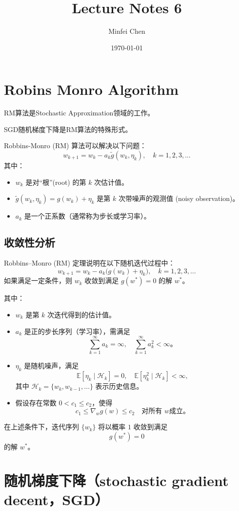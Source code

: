 \documentclass{article}
\begin{document}
\title{Lecture Notes 6}
\author{Minfei Chen}
\date{\today}
\maketitle
\section{Robins Monro Algorithm}
RM算法是Stochastic Approximation领域的工作。

SGD随机梯度下降是RM算法的特殊形式。

Robbins-Monro (RM) 算法可以解决以下问题：
\[
w_{k+1} = w_k - a_k \tilde{g}(w_k, \eta_k), \quad k = 1, 2, 3, \dots
\]
其中：
\begin{itemize}
    \item $w_k$ 是对“根”(root) 的第 $k$ 次估计值。
    \item $\tilde{g}(w_k, \eta_k) = g(w_k) + \eta_k$ 是第 $k$ 次带噪声的观测值 (noisy observation)。
    \item $a_k$ 是一个正系数（通常称为步长或学习率）。
\end{itemize}
\subsection{收敛性分析}
Robbins--Monro (RM) 定理说明在以下随机迭代过程中：
\[
w_{k+1} = w_k - a_k \big(g(w_k) + \eta_k\big), \quad k = 1, 2, 3, \dots
\]
如果满足一定条件，则 $w_k$ 收敛到满足 $g(w^*) = 0$ 的解 $w^*$。

其中：
\begin{itemize}
    \item $w_k$ 是第 $k$ 次迭代得到的估计值。
    \item $a_k$ 是正的步长序列（学习率），需满足
    \[
        \sum_{k=1}^\infty a_k = \infty, \quad \sum_{k=1}^\infty a_k^2 < \infty。
    \]
    \item $\eta_k$ 是随机噪声，满足
    \[
        \mathbb{E}[\eta_k \mid \mathcal{H}_k] = 0, 
        \quad \mathbb{E}[\eta_k^2 \mid \mathcal{H}_k] < \infty,
    \]
    其中 $\mathcal{H}_k = \{w_k, w_{k-1}, \dots\}$ 表示历史信息。
    \item 假设存在常数 $0 < c_1 \leq c_2$，使得
    \[
        c_1 \leq \nabla_w g(w) \leq c_2 \quad \text{对所有 } w \text{成立}。
    \]
\end{itemize}

在上述条件下，迭代序列 $\{w_k\}$ 将以概率 $1$ 收敛到满足
\[
g(w^*) = 0
\]
的解 $w^*$。
\section{随机梯度下降（stochastic gradient decent，SGD）}
\end{document}
